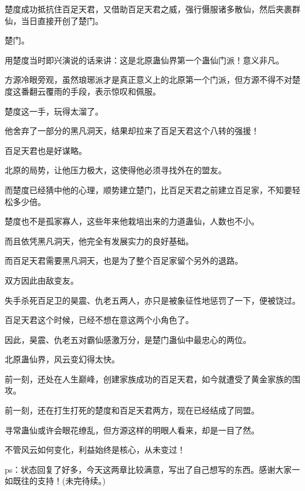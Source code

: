 \begin{this_body}
楚度成功抵抗住百足天君，又借助百足天君之威，强行慑服诸多散仙，然后夹裹群仙，当日直接开创了楚门。

楚门。

用楚度当时即兴演说的话来讲：这是北原蛊仙界第一个蛊仙门派！意义非凡。

方源冷眼旁观，虽然琅琊派才是真正意义上的北原第一个门派，但方源不得不对楚度这番翻云覆雨的手段，表示惊叹和佩服。

楚度这一手，玩得太溜了。

他舍弃了一部分的黑凡洞天，结果却拉来了百足天君这个八转的强援！

百足天君也是好谋略。

北原的局势，让他压力极大，这使得他必须寻找外在的盟友。

而楚度已经猜中他的心理，顺势建立楚门，比百足天君之前建立百足家，不知要轻松多少倍。

楚度也不是孤家寡人，这些年来他栽培出来的力道蛊仙，人数也不小。

而且依凭黑凡洞天，他完全有发展实力的良好基础。

而百足天君需要黑凡洞天，也是为了整个百足家留个另外的退路。

双方因此由敌变友。

失手杀死百足卫的昊震、仇老五两人，亦只是被象征性地惩罚了一下，便被饶过。

百足天君这个时候，已经不想在意这两个小角色了。

因此，昊震、仇老五对霸仙感激万分，是楚门蛊仙中最忠心的两位。

北原蛊仙界，风云变幻得太快。

前一刻，还处在人生巅峰，创建家族成功的百足天君，如今就遭受了黄金家族的围攻。

前一刻，还在打生打死的楚度和百足天君两方，现在已经结成了同盟。

寻常蛊仙或许会眼花缭乱，但方源这样的明眼人看来，却是一目了然。

不管风云如何变化，利益始终是核心，从未变过！

ps：状态回复了好多，今天这两章比较满意，写出了自己想写的东西。感谢大家一如既往的支持！(未完待续。)

\end{this_body}

